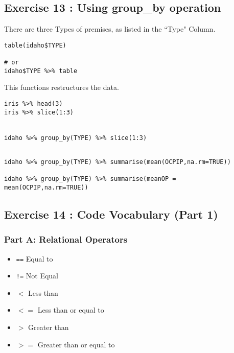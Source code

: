 \documentclass{article}
\begin{document}

\subsection*{Exercise 13 : Using group\_by operation}

There are three Types of premises, as listed in the ``Type" Column.

\begin{framed}
\begin{verbatim}
table(idaho$TYPE)   

# or
idaho$TYPE %>% table
\end{verbatim}
\end{framed}

This functions restructures the data.

\begin{framed}
\begin{verbatim}
iris %>% head(3)
iris %>% slice(1:3)


idaho %>% group_by(TYPE) %>% slice(1:3)
\end{verbatim}
\end{framed}

\begin{framed}
\begin{verbatim}

idaho %>% group_by(TYPE) %>% summarise(mean(OCPIP,na.rm=TRUE))

idaho %>% group_by(TYPE) %>% summarise(meanOP = mean(OCPIP,na.rm=TRUE))
\end{verbatim}
\end{framed}


\subsection*{Exercise 14 : Code Vocabulary (Part 1)}

\subsubsection*{Part A: Relational Operators}

\begin{framed}
\begin{multicols}{3}
\begin{itemize}
	\item \texttt{==} Equal to
	\item \texttt{!=} Not Equal
	\item \texttt{$<$} Less than
	\item \texttt{$<=$} Less than or equal to
	\item \texttt{$>$} Greater than
	\item \texttt{$>=$} Greater than or equal to
\end{itemize}
\end{multicols}
\end{framed}
	
\end{document}
